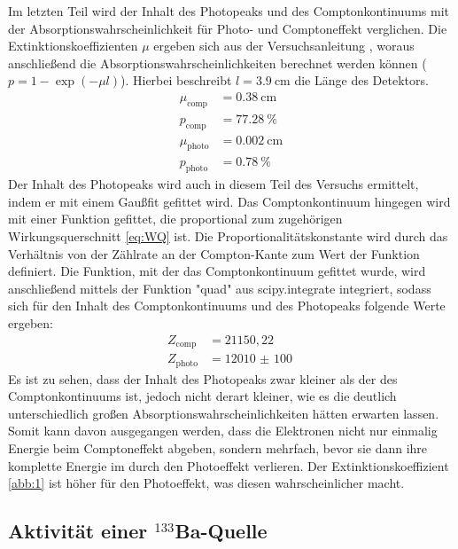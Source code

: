 \noindent Im letzten Teil wird der Inhalt des Photopeaks und des Comptonkontinuums mit der Absorptionswahrscheinlichkeit für Photo- und Comptoneffekt verglichen.
Die Extinktionskoeffizienten $\mu$ ergeben sich aus der Versuchsanleitung \cite{Q1}, woraus anschließend die Absorptionswahrscheinlichkeiten berechnet werden können ($p = 1-\exp(-\mu l)$). Hierbei beschreibt $l= \SI{3,9}{\centi \meter}$ die Länge des Detektors.
\begin{align*}
    \mu_{\text{comp}} &= \SI{0,38}{\centi \meter} \\
    p_{\text{comp}} &= \SI{77,28}{\percent}\\
    \mu_{\text{photo}} &= \SI{0,002}{\centi \meter} \\
    p_{\text{photo}} &= \SI{0,78}{\percent}
\end{align*}
Der Inhalt des Photopeaks wird auch in diesem Teil des Versuchs ermittelt, indem er mit einem Gaußfit gefittet wird. Das Comptonkontinuum hingegen wird mit einer Funktion gefittet, die proportional zum zugehörigen Wirkungsquerschnitt \ref{eq:WQ} ist. Die Proportionalitätskonstante wird durch das Verhältnis von der Zählrate an der Compton-Kante zum Wert der Funktion definiert.
Die Funktion, mit der das Comptonkontinuum gefittet wurde, wird anschließend mittels der Funktion "quad" aus scipy.integrate integriert, sodass sich für den Inhalt des Comptonkontinuums und des Photopeaks folgende Werte ergeben:
\begin{align*}
    Z_{\text{comp}}  &= 21150,22 \\
    Z_{\text{photo}} &= \SI{12010(100)}{}
\end{align*}
Es ist zu sehen, dass der Inhalt des Photopeaks zwar kleiner als der des  Comptonkontinuums ist, jedoch nicht derart kleiner, wie es die deutlich unterschiedlich großen Absorptionswahrscheinlichkeiten hätten erwarten lassen.
Somit kann davon ausgegangen werden, dass die Elektronen nicht nur einmalig Energie beim Comptoneffekt abgeben, sondern mehrfach, bevor sie dann ihre komplette Energie im durch den Photoeffekt verlieren.
Der Extinktionskoeffizient \ref{abb:1} ist höher für den Photoeffekt, was diesen wahrscheinlicher macht.

\subsection{Aktivität einer $^{133}$Ba-Quelle}

